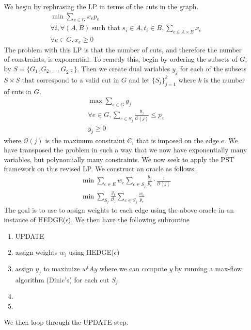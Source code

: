 \documentclass{article}
\newcommand{\problem}[1]{\noindent {\bf #1}}
\newcommand{\problempart}[1]{\noindent{\textbf{(#1)}}}
\begin{document}
\problempart{b}
We begin by rephrasing the LP in terms of the cuts in the graph. 
\begin{align*}
\min \sum_{e \in G} x_ep_e \\
\forall i, \forall (A,B) \text{ such that } s_i \in A, t_i \in B, \sum_{e \in A \times B} x_e \\
\forall e \in G,  x_e \geq 0
\end{align*}
The problem with this LP is that the number of cuts, and therefore the number of constraints, is exponential. To remedy this, begin by ordering the subsets of $G$, by $S = \{G_1, G_2, \ldots, G_{2^{|G|}}\}$. Then we create dual variables $y_j$ for each of the subsets $S \times S$ that correspond to a valid cut in $G$ and let $\{S_j\}_{j=1}^k$ where $k$ is the number of cuts in $G$.  
\begin{align*}
\max \sum_{e \in G} y_j \\
\forall e \in G, \sum_{e \in S_j} \frac{y_j}{\mathcal{O}(j)} \leq p_e \\
y_j \geq 0 
\end{align*}
where $\mathcal{O}(j)$ is the maximum constraint $C_i$ that is imposed on the edge $e$. We have transposed the problem in such a way that we now have exponentially many variables, but polynomially many constraints. We now seek to apply the PST framework on this revised LP. We construct an oracle as follows:
\begin{align*}
\min \sum_{e\in E} w_e \sum_{e\in S_j} \frac{y_j}{p_e}\cdot \frac{1}{\mathcal{O}(j)} \\
\min \sum_{S_j} \frac{y_j}{\mathcal{O}_j} \sum_{e \in S_j} \frac{w_e}{p_e}
\end{align*}
The goal is to use to assign weights to each edge using the above oracle in an instance of HEDGE($\epsilon$). We then have the following subroutine

\begin{enumerate}
\item UPDATE
\item assign weights $w_i$ using HEDGE($\epsilon$)
\item assign $y_j$ to maximize $w^tAy$ where we can compute $y$ by running a max-flow algorithm (Dinic's) for each cut $S_j$
\item 
\item
\end{enumerate}
We then loop through the UPDATE step. 

\problem{Problem 3.}

\problempart{a} 
\end{document}
